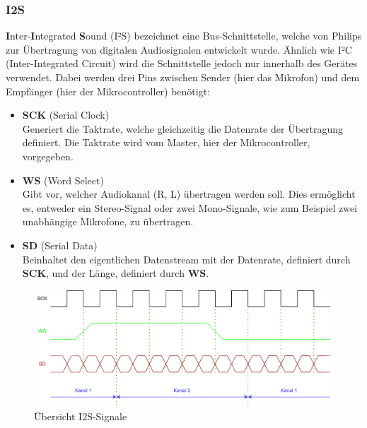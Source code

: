\documentclass[12pt]{article}
\begin{document}
	
	\subsubsection*{I2S} \label{I2S}
	\textbf{I}nter-\textbf{I}ntegrated \textbf{S}ound (I²S) bezeichnet eine Bus-Schnittstelle, welche von Philips zur Übertragung von digitalen Audiosignalen entwickelt wurde. Ähnlich wie I²C (Inter-Integrated Circuit) wird die Schnittstelle jedoch nur innerhalb des Gerätes verwendet. Dabei werden drei Pins zwischen Sender (hier das Mikrofon) und dem Empfänger (hier der Mikrocontroller) benötigt:
	\begin{itemize}
		\item \textbf{SCK} \quad (Serial Clock) \\
		Generiert die Taktrate, welche gleichzeitig die Datenrate der Übertragung definiert. Die Taktrate wird vom Master, hier der Mikrocontroller,  vorgegeben.
		\item \color{green}\textbf{WS}\color{black} \quad (Word Select) \\
		Gibt vor, welcher Audiokanal (R, L) übertragen werden soll. Dies ermöglicht es, entweder ein Stereo-Signal oder zwei Mono-Signale, wie zum Beispiel zwei unabhängige Mikrofone, zu übertragen.
		\item \color{red}\textbf{SD}\color{black} \quad (Serial Data) \\
		Beinhaltet den eigentlichen Datenstream mit der Datenrate, definiert durch \textbf{SCK}, und der Länge, definiert durch \color{green}\textbf{WS}\color{black}.
	\end{itemize}
	\begin{figure}[H]
		\centering
		\includegraphics[width=1\linewidth]{images/BAT_I2S}
		\caption[]{Übersicht I2S-Signale}
		\label{fig:bati2s}
	\end{figure}
	\newpage
\end{document}
